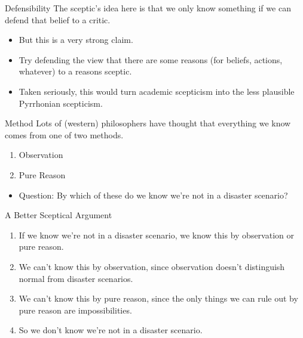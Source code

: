 \documentclass[
  17pt,
  letterpaper,
  ignorenonframetext,
  aspectratio=169,
  handout]{beamer}
\providecommand{\tightlist}{%
  \setlength{\itemsep}{0pt}\setlength{\parskip}{0pt}}\usepackage{longtable,booktabs,array}
\begin{document}
\begin{frame}{Defensibility}
\protect\hypertarget{defensibility}{}
The sceptic's idea here is that we only know something if we can defend
that belief to a critic.

\begin{itemize}[<+->]
\tightlist
\item
  But this is a very strong claim.
\item
  Try defending the view that there are some reasons (for beliefs,
  actions, whatever) to a reasons sceptic.
\item
  Taken seriously, this would turn academic scepticism into the less
  plausible Pyrrhonian scepticism.
\end{itemize}
\end{frame}

\begin{frame}{Method}
\protect\hypertarget{method}{}
Lots of (western) philosophers have thought that everything we know
comes from one of two methods.

\begin{enumerate}[<+->]
\tightlist
\item
  Observation
\item
  Pure Reason
\end{enumerate}

\begin{itemize}[<+->]
\tightlist
\item
  Question: By which of these do we know we're not in a disaster
  scenario?
\end{itemize}
\end{frame}

\begin{frame}{A Better Sceptical Argument}
\protect\hypertarget{a-better-sceptical-argument}{}
\begin{enumerate}[<+->]
\tightlist
\item
  If we know we're not in a disaster scenario, we know this by
  observation or pure reason.
\item
  We can't know this by observation, since observation doesn't
  distinguish normal from disaster scenarios.
\item
  We can't know this by pure reason, since the only things we can rule
  out by pure reason are impossibilities.
\item
  So we don't know we're not in a disaster scenario.
\end{enumerate}
\end{frame}
\end{document}

